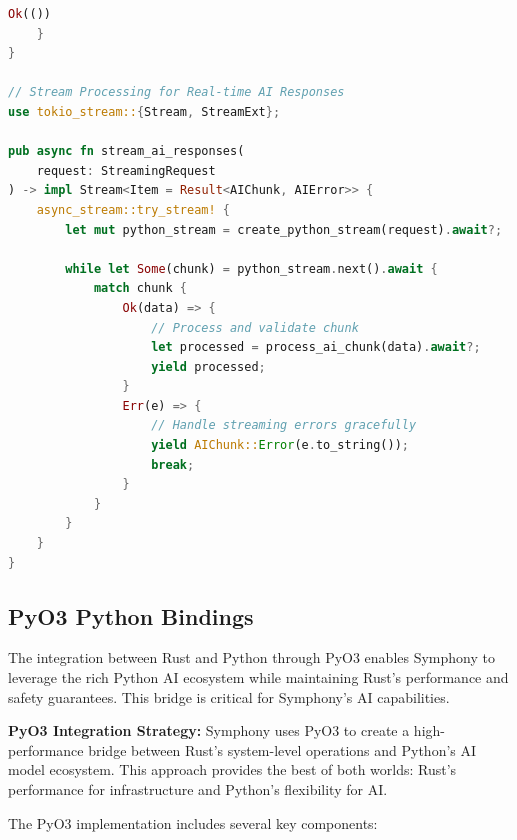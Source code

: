 \begin{lstlisting}[language=Rust, caption=Tokio-Based Async Architecture]
        Ok(())
    }
}

// Stream Processing for Real-time AI Responses
use tokio_stream::{Stream, StreamExt};

pub async fn stream_ai_responses(
    request: StreamingRequest
) -> impl Stream<Item = Result<AIChunk, AIError>> {
    async_stream::try_stream! {
        let mut python_stream = create_python_stream(request).await?;
        
        while let Some(chunk) = python_stream.next().await {
            match chunk {
                Ok(data) => {
                    // Process and validate chunk
                    let processed = process_ai_chunk(data).await?;
                    yield processed;
                }
                Err(e) => {
                    // Handle streaming errors gracefully
                    yield AIChunk::Error(e.to_string());
                    break;
                }
            }
        }
    }
}
\end{lstlisting}

\subsection*{PyO3 Python Bindings}

The integration between Rust and Python through PyO3 enables Symphony to leverage the rich Python AI ecosystem while maintaining Rust's performance and safety guarantees. This bridge is critical for Symphony's AI capabilities.

\begin{successbox}
\textbf{PyO3 Integration Strategy:} Symphony uses PyO3 to create a high-performance bridge between Rust's system-level operations and Python's AI model ecosystem. This approach provides the best of both worlds: Rust's performance for infrastructure and Python's flexibility for AI.
\end{successbox}

The PyO3 implementation includes several key components:

